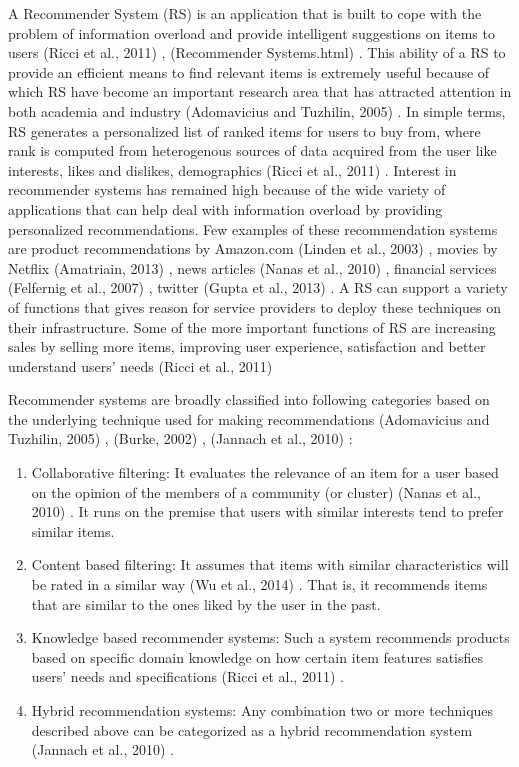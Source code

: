 \documentclass[12pt]{article}
\begin{document}
A Recommender System (RS) is an application that is built to cope with the problem of information overload and provide intelligent suggestions on items to users (Ricci et al., 2011) \cite{ricci}, (Recommender Systems.html) \cite{recommender systems.html}. This ability of a RS to provide an efficient means to find relevant items is extremely useful because of which RS have become an important research area that has attracted attention in both academia and industry (Adomavicius and Tuzhilin, 2005) \cite{adomavicius-2005}. In simple terms, RS generates a personalized list of ranked items for users to buy from, where rank is computed from heterogenous sources of data acquired from the user like interests, likes and dislikes, demographics (Ricci et al., 2011) \cite{ricci}. Interest in recommender systems has remained high because of the wide variety of applications that can help deal with information overload by providing personalized recommendations. Few examples of these recommendation systems are product recommendations by Amazon.com (Linden et al., 2003) \cite{linden}, movies by Netflix (Amatriain, 2013) \cite{amatriain}, news articles (Nanas et al., 2010) \cite{nanas}, financial services (Felfernig et al., 2007) \cite{felfernig}, twitter (Gupta et al., 2013) \cite{gupta}. A RS can support a variety of functions that gives reason for service providers to deploy these techniques on their infrastructure. Some of the more important functions of RS are increasing sales by selling more items, improving user experience, satisfaction and better understand users' needs (Ricci et al., 2011) \cite{ricci}

Recommender systems are broadly classified into following categories based on the underlying technique used for making recommendations (Adomavicius and Tuzhilin, 2005) \cite{adomavicius-2005}, (Burke, 2002) \cite{burke}, (Jannach et al., 2010) \cite{jannach}:

\begin{enumerate}
\item Collaborative filtering: It evaluates the relevance of an item for a user based on the opinion of the members of a community (or cluster) (Nanas et al., 2010) \cite{nanas}. It runs on the premise that users with similar interests tend to prefer similar items.
\item Content based filtering: It assumes that items with similar characteristics will be rated in a similar way (Wu et al., 2014) \cite{wu}. That is, it recommends items that are similar to the ones liked by the user in the past.
\item Knowledge based recommender systems: Such a system recommends products based on specific domain knowledge on how certain item features satisfies users' needs and specifications (Ricci et al., 2011) \cite{ricci}. 
\item Hybrid recommendation systems: Any combination two or more techniques described above can be categorized as a hybrid recommendation system (Jannach et al., 2010) \cite{jannach}.
\end{enumerate}
\end{document}
